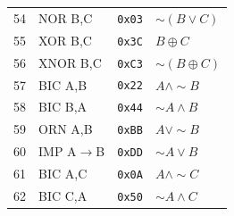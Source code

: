 \documentclass[10pt,landscape,a4paper]{article}
\begin{document}
\begin{minipage}[t]{0.22\textwidth}
\begin{tabular}{@{}rlcl@{}}
    54 & NOR B,C & \texttt{0x03} & $\sim(B \vee C)$ \\
    55 & XOR B,C & \texttt{0x3C} & $B \oplus C$ \\
    56 & XNOR B,C & \texttt{0xC3} & $\sim(B \oplus C)$ \\
    57 & BIC A,B & \texttt{0x22} & $A \wedge \sim B$ \\
    58 & BIC B,A & \texttt{0x44} & $\sim A \wedge B$ \\
    59 & ORN A,B & \texttt{0xBB} & $A \vee \sim B$ \\
    60 & IMP A$\to$B & \texttt{0xDD} & $\sim A \vee B$ \\
    61 & BIC A,C & \texttt{0x0A} & $A \wedge \sim C$ \\
    62 & BIC C,A & \texttt{0x50} & $\sim A \wedge C$ \\
    \bottomrule
    \end{tabular}
\end{minipage}%
\hfill
\end{document}
